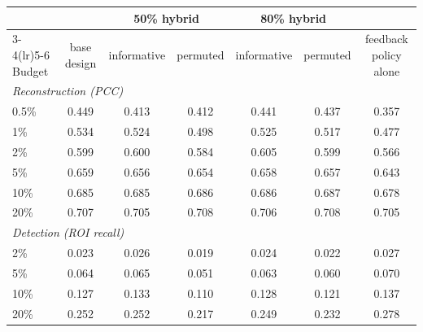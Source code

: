 \begin{tabular}{lcccccc}
\toprule
 & & \multicolumn{2}{c}{50\% hybrid} & \multicolumn{2}{c}{80\% hybrid} & \\
\cmidrule(lr){3-4}\cmidrule(lr){5-6}
Budget & base design & informative & permuted & informative & permuted & feedback policy alone \\
\midrule
\multicolumn{7}{l}{\emph{Reconstruction (PCC)}} \\
0.5\% & 0.449 & 0.413 & 0.412 & 0.441 & 0.437 & 0.357 \\
1\% & 0.534 & 0.524 & 0.498 & 0.525 & 0.517 & 0.477 \\
2\% & 0.599 & 0.600 & 0.584 & 0.605 & 0.599 & 0.566 \\
5\% & 0.659 & 0.656 & 0.654 & 0.658 & 0.657 & 0.643 \\
10\% & 0.685 & 0.685 & 0.686 & 0.686 & 0.687 & 0.678 \\
20\% & 0.707 & 0.705 & 0.708 & 0.706 & 0.708 & 0.705 \\
\midrule
\multicolumn{7}{l}{\emph{Detection (ROI recall)}} \\
2\% & 0.023 & 0.026 & 0.019 & 0.024 & 0.022 & 0.027 \\
5\% & 0.064 & 0.065 & 0.051 & 0.063 & 0.060 & 0.070 \\
10\% & 0.127 & 0.133 & 0.110 & 0.128 & 0.121 & 0.137 \\
20\% & 0.252 & 0.252 & 0.217 & 0.249 & 0.232 & 0.278 \\
\bottomrule
\end{tabular}